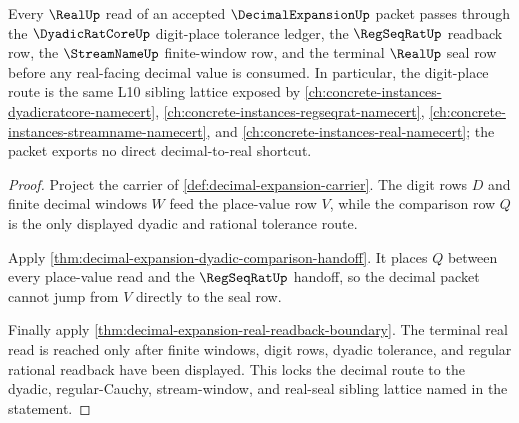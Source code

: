 \begin{theorem}\label{thm:decimal-expansion-dyadic-normalization-lock}
Every $\RealUp$ read of an accepted $\DecimalExpansionUp$ packet passes through the $\DyadicRatCoreUp$ digit-place tolerance ledger, the $\RegSeqRatUp$ readback row, the $\StreamNameUp$ finite-window row, and the terminal $\RealUp$ seal row before any real-facing decimal value is consumed. In particular, the digit-place route is the same L10 sibling lattice exposed by \autoref{ch:concrete-instances-dyadicratcore-namecert}, \autoref{ch:concrete-instances-regseqrat-namecert}, \autoref{ch:concrete-instances-streamname-namecert}, and \autoref{ch:concrete-instances-real-namecert}; the packet exports no direct decimal-to-real shortcut.
\end{theorem}
\begin{proof}
Project the carrier of \autoref{def:decimal-expansion-carrier}. The digit rows $D$ and finite decimal windows $W$ feed the place-value row $V$, while the comparison row $Q$ is the only displayed dyadic and rational tolerance route.

Apply \autoref{thm:decimal-expansion-dyadic-comparison-handoff}. It places $Q$ between every place-value read and the $\RegSeqRatUp$ handoff, so the decimal packet cannot jump from $V$ directly to the seal row.

Finally apply \autoref{thm:decimal-expansion-real-readback-boundary}. The terminal real read is reached only after finite windows, digit rows, dyadic tolerance, and regular rational readback have been displayed. This locks the decimal route to the dyadic, regular-Cauchy, stream-window, and real-seal sibling lattice named in the statement.
\end{proof}

